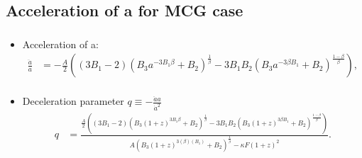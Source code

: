 \documentclass{beamer}
\newcommand{\brac}[1]{\left(#1\right)}
\begin{document}
\subsection{Acceleration of a for MCG case}
\begin{frame}
\frametitle{\insertsectionhead}
\framesubtitle{\insertsubsectionhead}
\fontsize{8pt}{7.2}\selectfont
\begin{itemize}
\item Acceleration of a:
\fontsize{6pt}{7.2}\selectfont
\begin{equation}\label{eq:ChRaych}
\begin{split}
\frac{\ddot{a}}{a} &= -\frac{A}{2}\brac{\brac{3B_{1}-2}\brac{B_{3}a^{-3B_{1}\beta}+B_{2}}^{\frac{1}{\beta}}-3B_{1}B_{2}\brac{B_{3}a^{-3\beta B_{1}}+B_{2}}^{\frac{1-\beta}{\beta}}},\\
\end{split}
\end{equation}
\fontsize{8pt}{7.2}\selectfont
\item Deceleration parameter $q\equiv-\frac{\ddot{a}a}{\dot{a}^{2}}$
\fontsize{6pt}{7.2}\selectfont
\begin{equation}\label{eq:ChModDecelZ}
\begin{split}
q &= \frac{\frac{A}{2}\brac{\brac{3B_{1}-2}\brac{B_{3}\brac{1+z}^{3B_{1}\beta}+B_{2}}^{\frac{1}{\beta}}-3B_{1}B_{2}\brac{B_{3}\brac{1+z}^{3\beta B_{1}}+B_{2}}^{\frac{1-\beta}{\beta}}}}{A\brac{B_{3}\brac{1+z}^{3\brac{\beta}\brac{B_{1}}}+B_{2}}^{\frac{1}{\beta}} -\kappa F\brac{1+z}^{2}}.
\end{split}
\end{equation}
\end{itemize}


\end{frame}
\end{document}
